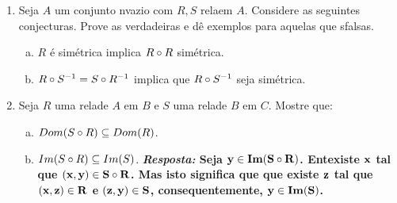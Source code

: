 \begin{enumerate}[{\bf 1.}]
\begin{enumerate}[a)]
{\bf{\it Resposta:} Suponha que ${\bf R}$ seja sim\'etrica. Seja ${\bf (x,y)\in R}$. Ent\ao ${\bf (y,x)\in R}$, logo ${\bf (x,y)\in R^{-1}}$ e ${\bf R\subseteq R^{-1}}$. Agora, suponha ${\bf (x,y)\in R^{-1}}$. Ent\ao ${\bf (y,x)\in R}$ logo ${\bf (x,y)\in R}$ e ${\bf R^{-1}\subset R}$ e assim temos que ${\bf R=R^{-1}}$. Para a outra implica\caoi, suponha que ${\bf R=R^{-1}}$. Seja ${\bf (x,y)\in R}$. Ent\ao ${\bf (x,y)\in R^{-1}}$ (pois ${\bf R=R^{-1}}$) portanto ${\bf (y,x)\in R}$ e ${\bf R}$ \'e sim\'etrica.} 

\item $R$ \'e transitiva se e somente se $R^{-1}$ \'e transitiva.
\item $R$ \'e uma rela\cao de equival\^encia e se somente se $R^{-1}$ \'e uma rela\cao de equival\^encia.
\item Suponha que $Dom(R)=A$. $R$ \'e uma rela\cao de equival\^encia se e somente se $R=R^{-1}=R\bola R$.
\item $R$ \'a assim\'etrica se e somente se $R\inter R^{-1}=\emptyset$.
\item $R\uni R^{-1}=A\times A$ implica que $R$ \'e completa.
\item $R$ sim\'etrica implica $R\bola R$ \'e sim\'etrica.
\item $I_{Dom(R)}\subseteq R^{-1}\bola R$.
\item $R$ \'e uma ordem parcial se e somente se $R^{-1}$ \'e uma ordem parcial.
\item $R$ \'e uma ordem parcial se e somente se $R\inter R^{-1}=I_A$ e $R\bola R=R$.
\item $R$ \'e uma ordem parcial estrita se e somente se $R^{-1}$ \'e uma ordem parcial estrita.
\end{enumerate}

\item Seja $A$ um conjunto n\ao vazio com $R,S$ rela\coes em $A$. Considere as seguintes conjecturas. Prove as verdadeiras e d\^e exemplos para aquelas que s\ao falsas.
\begin{enumerate}[a)]
\item $R$ \'e sim\'etrica implica $R\bola R$ sim\'etrica.
\item $R\circ S^{-1}=S\circ R^{-1}$ implica que $R\circ S^{-1}$ seja sim\'etrica.
\end{enumerate}

\item Seja $R$ uma rela\cao de $A$ em $B$ e $S$ uma rela\cao  de $B$ em $C$. Mostre que:
\begin{enumerate}[a)]
\item $Dom(S\circ R)\subseteq Dom(R)$.
\item $Im(S\circ R)\subseteq Im(S)$.
{\bf{\it Resposta:} Seja ${\bf y\in Im(S\circ R)}$. Ent\ao existe ${\bf x}$ tal que ${\bf (x,y)\in S\circ R}$. Mas isto significa que que existe ${\bf z}$ tal que ${\bf (x,z)\in R}$ e ${\bf (z,y)\in S}$, consequentemente, ${\bf y\in Im(S)}$.}


\end{enumerate}
\end{enumerate}
